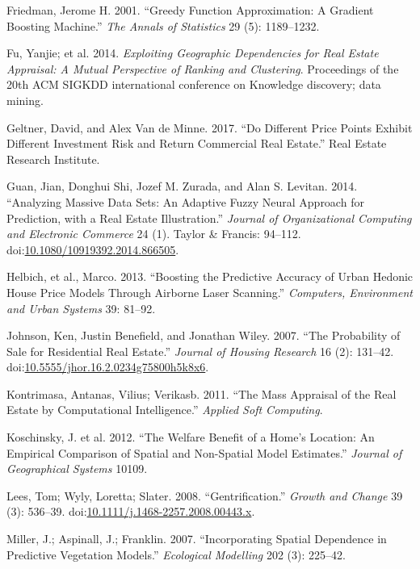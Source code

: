 \documentclass[]{article}
\begin{document}
\hypertarget{ref-Friedman2001}{}
Friedman, Jerome H. 2001. ``Greedy Function Approximation: A Gradient
Boosting Machine.'' \emph{The Annals of Statistics} 29 (5): 1189--1232.

\hypertarget{ref-Fu2014}{}
Fu, Yanjie; et al. 2014. \emph{Exploiting Geographic Dependencies for
Real Estate Appraisal: A Mutual Perspective of Ranking and Clustering}.
Proceedings of the 20th ACM SIGKDD international conference on Knowledge
discovery; data mining.

\hypertarget{ref-Geltner2017}{}
Geltner, David, and Alex Van de Minne. 2017. ``Do Different Price Points
Exhibit Different Investment Risk and Return Commercial Real Estate.''
Real Estate Research Institute.

\hypertarget{ref-Guan2014}{}
Guan, Jian, Donghui Shi, Jozef M. Zurada, and Alan S. Levitan. 2014.
``Analyzing Massive Data Sets: An Adaptive Fuzzy Neural Approach for
Prediction, with a Real Estate Illustration.'' \emph{Journal of
Organizational Computing and Electronic Commerce} 24 (1). Taylor \&
Francis: 94--112.
doi:\href{https://doi.org/10.1080/10919392.2014.866505}{10.1080/10919392.2014.866505}.

\hypertarget{ref-Helbich2013}{}
Helbich, et al., Marco. 2013. ``Boosting the Predictive Accuracy of
Urban Hedonic House Price Models Through Airborne Laser Scanning.''
\emph{Computers, Environment and Urban Systems} 39: 81--92.

\hypertarget{ref-Johnson2007}{}
Johnson, Ken, Justin Benefield, and Jonathan Wiley. 2007. ``The
Probability of Sale for Residential Real Estate.'' \emph{Journal of
Housing Research} 16 (2): 131--42.
doi:\href{https://doi.org/10.5555/jhor.16.2.0234g75800h5k8x6}{10.5555/jhor.16.2.0234g75800h5k8x6}.

\hypertarget{ref-Kontrimasa2011}{}
Kontrimasa, Antanas, Vilius; Verikasb. 2011. ``The Mass Appraisal of the
Real Estate by Computational Intelligence.'' \emph{Applied Soft
Computing}.

\hypertarget{ref-Koschinsky2012}{}
Koschinsky, J. et al. 2012. ``The Welfare Benefit of a Home's Location:
An Empirical Comparison of Spatial and Non-Spatial Model Estimates.''
\emph{Journal of Geographical Systems} 10109.

\hypertarget{ref-Lees2008}{}
Lees, Tom; Wyly, Loretta; Slater. 2008. ``Gentrification.'' \emph{Growth
and Change} 39 (3): 536--39.
doi:\href{https://doi.org/10.1111/j.1468-2257.2008.00443.x}{10.1111/j.1468-2257.2008.00443.x}.

\hypertarget{ref-Miller2015}{}
Miller, J.; Aspinall, J.; Franklin. 2007. ``Incorporating Spatial
Dependence in Predictive Vegetation Models.'' \emph{Ecological
Modelling} 202 (3): 225--42.
\end{document}
